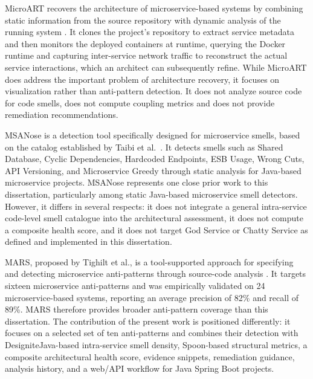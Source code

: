 \par MicroART recovers the architecture of microservice-based systems by combining static information from the source repository with dynamic analysis of the running system \cite{Granchelli2017}. It clones the project's repository to extract service metadata and then monitors the deployed containers at runtime, querying the Docker runtime and capturing inter-service network traffic to reconstruct the actual service interactions, which an architect can subsequently refine. While MicroART does address the important problem of architecture recovery, it focuses on visualization rather than anti-pattern detection. It does not analyze source code for code smells, does not compute coupling metrics and does not provide remediation recommendations.

\par MSANose is a detection tool specifically designed for microservice smells, based on the catalog established by Taibi et al.\ \cite{Walker2020}. It detects smells such as Shared Database, Cyclic Dependencies, Hardcoded Endpoints, ESB Usage, Wrong Cuts, API Versioning, and Microservice Greedy through static analysis for Java-based microservice projects. MSANose represents one close prior work to this dissertation, particularly among static Java-based microservice smell detectors. However, it differs in several respects: it does not integrate a general intra-service code-level smell catalogue into the architectural assessment, it does not compute a composite health score, and it does not target God Service or Chatty Service as defined and implemented in this dissertation.

\par MARS, proposed by Tighilt et al., is a tool-supported approach for specifying and detecting microservice anti-patterns through source-code analysis \cite{Tighilt2023}. It targets sixteen microservice anti-patterns and was empirically validated on 24 microservice-based systems, reporting an average precision of 82\% and recall of 89\%. MARS therefore provides broader anti-pattern coverage than this dissertation. The contribution of the present work is positioned differently: it focuses on a selected set of ten anti-patterns and combines their detection with DesigniteJava-based intra-service smell density, Spoon-based structural metrics, a composite architectural health score, evidence snippets, remediation guidance, analysis history, and a web/API workflow for Java Spring Boot projects.


